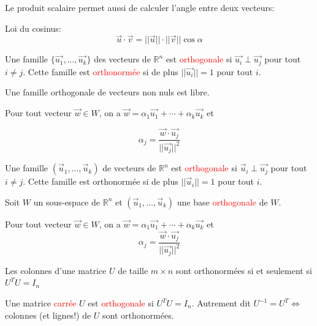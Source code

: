  Le produit scalaire permet aussi de calculer l'angle entre deux vecteurs:
 \begin{theoreme}
     Loi du cosinus:
     \[\vec{u}\cdot \vec{v} = ||\vec{u}||\cdot ||\vec{v}||\cos \alpha\]
 \end{theoreme}
    \begin{definition}
        Une famille $\{\vec{u_1}, \dots, \vec{u_k}\}$ des vecteurs de $\mathbb{R}^n$ est \textcolor{red}{orthogonale} si $\vec{u_i}\perp \vec{u_j}$ pour tout $i \neq j$. Cette famille est \textcolor{red}{orthonormée} si de plus $||\vec{u_i}|| = 1$ pour tout $i$.
    \end{definition}
    \begin{theoreme}
        Une famille orthogonale de vecteurs non nuls est libre.
    \end{theoreme}
    \begin{theoreme}
        Pour tout vecteur $\vec{w} \in W$, on a $\vec{w} = \alpha_1\vec{u_1} + \cdots + \alpha_k\vec{u_k}$ et 
        \begin{formule}
            \[\alpha_j = \frac{\vec{w}\cdot\vec{u_j}}{||\vec{u_j}||^2}\]
        \end{formule}
    \end{theoreme}
    \begin{definition}
        Une famille $(\vec{u}_1, \dots, \vec{u}_k)$ de vecteurs de $\mathbb{R}^n$ est \textcolor{red}{orthogonale} si $\vec{u}_i \perp \vec{u_j}$ pour tout $i \neq j$. Cette famille est orthonormée si de plus $||\vec{u}_i|| = 1$ pour tout $i$.
    \end{definition}
    Soit $W$ un sous-espace de $\mathbb{R}^n$ et $(\vec{u}_1, \dots, \vec{u}_k)$ une base \textcolor{red}{orthogonale} de $W$.
    \begin{theoreme}
        Pour tout vecteur $\vec{w}\in W$, on a $\vec{w} = \alpha_1\vec{u_1} + \cdots + \alpha_k\vec{u_k}$ et
        \[\alpha_j = \frac{\vec{w}\cdot\vec{u_j}}{||\vec{u_j}||^2}\]
    \end{theoreme}
    \begin{theoreme}
        Les colonnes d'une matrice $U$ de taille $m\times n$ sont orthonormées si et seulement si $U^TU = I_n$
    \end{theoreme}
    \begin{definition}
        Une matrice \textcolor{red}{carrée} $U$ est \textcolor{red}{orthogonale} si $U^TU = I_n$. Autrement dit $U^{-1} = U^T \Leftrightarrow$ colonnes (et lignes!) de $U$ sont orthonormées.
    \end{definition}
